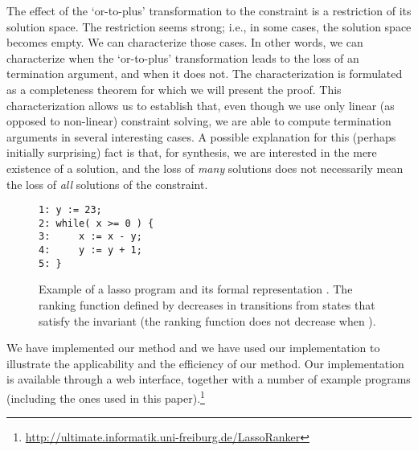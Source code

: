 \documentclass[a4paper]{llncs}
\begin{document}
The effect of the `or-to-plus' transformation to the constraint is a restriction of its solution space.  The restriction seems strong; i.e., in some cases, the solution space becomes empty.
We can characterize those cases. In other words, we can characterize when the `or-to-plus' transformation leads to the loss of an termination argument, and when it does not.
The characterization is formulated as a completeness theorem for which we will present the proof.
This characterization allows us to establish that, even though we use only linear (as opposed to non-linear) constraint solving, we are able to compute termination arguments in several interesting cases.
A possible explanation for this (perhaps initially surprising) fact is that, for synthesis, we are interested in the mere existence of a solution, and the loss of \emph{many} solutions does not necessarily mean the loss of \emph{all} solutions of the constraint.  


\begin{figure}[t]
\begin{center}
\begin{minipage}{4cm}

\begin{verbatim}
1: y := 23;
2: while( x >= 0 ) {
3:     x := x - y;
4:     y := y + 1;
5: }
\end{verbatim}

\end{minipage}
\begin{minipage}{6cm}
\end{minipage}
\end{center}
\caption{Example of a lasso program and its formal representation .
The ranking function defined by  decreases in transitions from states that satisfy the invariant  (the ranking function does not decrease when ).
}
\label{fig-bangalore}
\end{figure}


We have implemented our method and we have used our implementation to illustrate the applicability and the efficiency of our method. Our implementation is available through a web interface, together with a number of example programs (including the ones used in this paper).\footnote{
\url{http://ultimate.informatik.uni-freiburg.de/LassoRanker}
}
\end{document}
